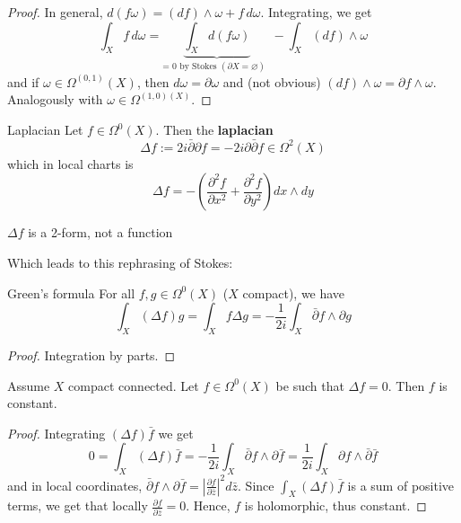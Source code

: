 \begin{proof}{}
    In general, \(d{(f \omega)} = {(df)} \wedge \omega + f \, d\omega\).
    Integrating, we get
    \[
        \int _X f \, d\omega = \underbrace{\int_X d{(f \omega)}}_\text{= 0 by
        Stokes \((\partial X = \varnothing)\) }   - \int_X {(df)} \wedge \omega 
    \]
    and if \(\omega \in \Omega^{{(0, 1)}}{(X)}\), then \(d\omega =
    \partial\omega\) and (not obvious) \({(df)} \wedge \omega = \partial f
    \wedge \omega\).  %
    Analogously with \(\omega \in \Omega^{{(1, 0)}{(X)}}\).

\end{proof}

\begin{definition}{Laplacian}
    Let \(f \in \Omega^{0}{(X)}\). Then the \textbf{laplacian}
    \[
      \Delta f := 2i \bar{\partial} \partial f = - 2i \partial \bar{\partial} f
      \in  \Omega^2{(X)}
    \]
    which in local charts is
    \[
      \Delta f = - {\left( \frac{\partial^2 f}{\partial x ^2} + \frac{\partial
      ^2 f}{\partial y^2}\right)} dx \wedge dy
    \]
\end{definition}
\begin{note}{}
    \(\Delta f\) is a 2-form, not a function
\end{note}


Which leads to this rephrasing of Stokes:
\begin{theorem}{Green's formula}
    For all \(f, g \in \Omega^{0}{(X)}\) (\(X\) compact), we have
    \[
      \int_X {(\Delta f)} g = \int_X f \Delta g = -\frac{1}{2i} \int_X
      \bar{\partial} f \wedge \partial g
    \]
\end{theorem}

\begin{proof}{}
    Integration by parts.
\end{proof}

\begin{corollary}{}
    Assume \(X\) compact connected. Let \(f \in \Omega^{0}{(X)}\) be such that
    \(\Delta f = 0\). Then \(f\) is constant.
\end{corollary}

\begin{proof}{}
    Integrating \({(\Delta f)} \bar{f}\) we get
    \[
      0 = \int_X {(\Delta f)} \bar{f} = - \frac{1}{2i} \int_X \bar{\partial} f
      \wedge \partial \bar{f} = \frac{1}{2i} \int_X \partial f \wedge
      \bar{\partial} \bar{f}
    \]
    and in local coordinates, \(\bar{\partial} f \wedge \partial \bar{f} =
    \left| \frac{\partial f}{\partial \bar{z}} \right| ^2 d\bar{z}\). Since
    \(\int_X {(\Delta f)} \bar{f}\) is a sum of positive terms, we get that
    locally \(\frac{\partial f}{\partial \bar{z}} = 0\). Hence, \(f\) is
    holomorphic, thus constant.
\end{proof}

